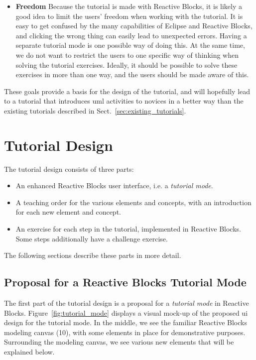\begin{itemize}
	\item{\textbf{Freedom}} Because the tutorial is made with Reactive Blocks, it is likely a good idea to limit the users' freedom when working with the tutorial. It is easy to get confused by the many capabilities of Eclipse and Reactive Blocks, and clicking the wrong thing can easily lead to unexpected errors. Having a separate tutorial mode is one possible way of doing this. At the same time, we do not want to restrict the users to one specific way of thinking when solving the tutorial exercises. Ideally, it should be possible to solve these exercises in more than one way, and the users should be made aware of this.
\end{itemize}

\noindent
These goals provide a basis for the design of the tutorial, and will hopefully lead to a tutorial that introduces \gls{uml} activities to novices in a better way than the existing tutorials described in Sect.~\ref{sec:existing_tutorials}.

\section{Tutorial Design}
\label{sec:tutorial_design}
The tutorial design consists of three parts:

\begin{itemize}
	\item An enhanced Reactive Blocks user interface, i.e. a \emph{tutorial mode}.
	\item A teaching order for the various elements and concepts, with an introduction for each new element and concept.
	\item An exercise for each step in the tutorial, implemented in Reactive Blocks. Some steps additionally have a challenge exercise.
\end{itemize}

\noindent
The following sections describe these parts in more detail.

\subsection{Proposal for a Reactive Blocks Tutorial Mode}
\label{sec:reactive_blocks_tutorial_mode}
The first part of the tutorial design is a proposal for a \emph{tutorial mode} in Reactive Blocks. Figure~\ref{fig:tutorial_mode} displays a visual mock-up of the proposed \gls{ui} design for the tutorial mode. In the middle, we see the familiar Reactive Blocks modeling canvas (10), with some elements in place for demonstrative purposes. Surrounding the modeling canvas, we see various new elements that will be explained below.

